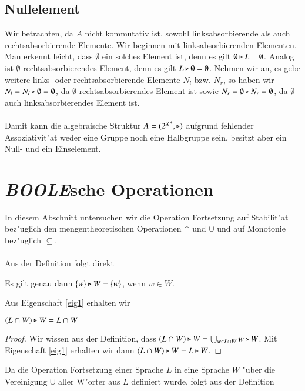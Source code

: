 \subsection{Nullelement}
Wir betrachten, da $A$ nicht kommutativ ist, sowohl linksabsorbierende als auch rechtsabsorbierende Elemente.
Wir beginnen mit linksabsorbierenden Elementen.
Man erkennt leicht, dass $\emptyset$ ein solches Element ist, denn es gilt $\emptyset\triangleright L = \emptyset$.
Analog ist $\emptyset$ rechtsabsorbierendes Element, denn es gilt $L\triangleright\emptyset =\emptyset$.
Nehmen wir an, es gebe weitere links- oder rechtsabsorbierende Elemente $N_l$ bzw. $N_r$, so haben wir $N_l = N_l\triangleright \emptyset = \emptyset$, da $\emptyset$ rechtsabsorbierendes Element ist sowie $N_r = \emptyset\triangleright N_r = \emptyset$, da $\emptyset$ auch linksabsorbierendes Element ist.\\\\
Damit kann die algebraische Struktur $A=({2^X}^*,\triangleright)$ aufgrund fehlender Assoziativit"at weder eine Gruppe noch eine Halbgruppe sein, besitzt aber ein Null- und ein Einselement.

\section{\emph{BOOLE}sche Operationen}
In diesem Abschnitt untersuchen wir die Operation Fortsetzung auf Stabilit"at bez"uglich den mengentheoretischen Operationen $\cap$ und $\cup$ und auf Monotonie bez"uglich $\subseteq$.
\\\\Aus der Definition folgt direkt

\vspace{2ex}

\begin{eigen}\label{eig1}
Es gilt genau dann $\{w\} \triangleright W = \{w\}$, wenn $w\in W$.
\end{eigen}

Aus Eigenschaft \ref{eig1} erhalten wir

\vspace{2ex}

\begin{eigen}
$(L\cap W) \triangleright W = L\cap W$
\end{eigen}
\begin{proof}
Wir wissen aus der Definition, dass $(L\cap W)\triangleright W = \bigcup_{w\in L\cap W} w\triangleright W$. Mit Eigenschaft \ref{eig1} erhalten wir dann $(L\cap W)\triangleright W = L\triangleright W$.
\end{proof}

Da die Operation Fortsetzung einer Sprache $L$ in eine Sprache $W$ "uber die Vereinigung $\cup$ aller W"orter aus $L$ definiert wurde, folgt aus der Definition

